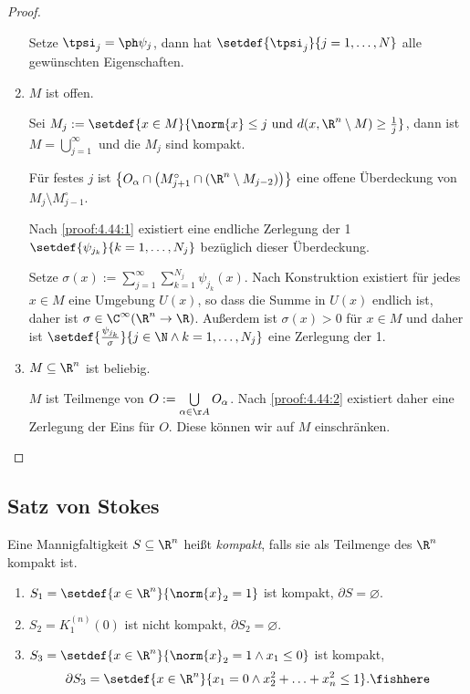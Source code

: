 \begin{proof}
\begin{bemn}
\begin{enumerate}[label=\alph{*})]
Setze $\tpsi_j = \ph\psi_j$, dann hat $\setdef{\tpsi_j}{j=1,\ldots,N}$ alle
gewünschten Eigenschaften.
\item\label{proof:4.44:2} $M$ ist offen.

Sei $M_j:=\setdef{x\in M}{\norm{x}\le j\text{ und }d(x,\R^n\setminus
M)\ge\frac{1}{j}}$, dann ist $M=\bigcup_{j=1}^\infty$ und die $M_j$ sind
kompakt.

Für festes $j$ ist $\left\{O_\alpha\cap\left(M_{j+1}^\circ
\cap(\R^n\setminus M_{j-2})\right)\right\}$ eine offene Überdeckung von
$M_j\setminus M_{j-1}^\circ$.

Nach \ref{proof:4.44:1} existiert eine endliche Zerlegung der 1
$\setdef{\psi_{j_k}}{k=1,\ldots,N_j}$ bezüglich dieser Überdeckung.

Setze $\sigma(x):=\sum\limits_{j=1}^\infty\sum\limits_{k=1}^{N_j}
\psi_{j_k}(x)$. Nach Konstruktion existiert für jedes $x\in M$ eine Umgebung $U(x)$, so dass
die Summe in $U(x)$ endlich ist, daher ist $\sigma\in\C^\infty(\R^n\to\R)$.
Außerdem ist $\sigma(x) > 0$ für $x\in M$ und daher ist
$\setdef{\frac{\psi_{j_k}}{\sigma}}{j\in\N\land k=1,\ldots,N_j}$ eine Zerlegung
der 1.
\item $M\subseteq\R^n$ ist beliebig.

$M$ ist Teilmenge von $O:=\bigcup\limits_{\alpha\in\AA} O_\alpha$. Nach \ref{proof:4.44:2}
existiert daher eine Zerlegung der Eins für $O$. Diese können wir auf $M$
einschränken.\qedhere
\end{enumerate}
\end{bemn}
\end{proof}

\subsection{Satz von Stokes}

\begin{defn}
\label{defn:4.49}
Eine Mannigfaltigkeit $S\subseteq\R^n$ heißt \emph{kompakt}, falls sie als
Teilmenge des $\R^n$ kompakt ist.\fishhere
\end{defn}

\begin{bsp}
\label{bsp:4.50}
\begin{enumerate}[label=\arabic{*}.)]
\item $S_1 =\setdef{x\in\R^n}{\norm{x}_2 = 1}$ ist kompakt, $\partial S =
\varnothing$.
\item $S_2 = K_1^{(n)}(0)$ ist nicht kompakt, $\partial S_2 = \varnothing$.
\item $S_3 = \setdef{x\in\R^n}{\norm{x}_2 = 1 \land x_1\le 0}$ ist kompakt,
\begin{align*}
\partial S_3 = \setdef{x\in\R^n}{x_1 = 0 \land x_2^2+\ldots+x_n^2 \le
1}.\fishhere
\end{align*}
\end{enumerate}
\end{bsp}

